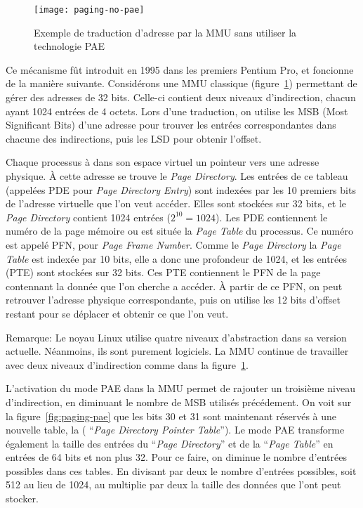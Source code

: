      \begin{figure}[h]
        \centering \texttt{[image: paging-no-pae]}
        \caption{Exemple de traduction d'adresse par la MMU sans utiliser la
          technologie PAE}
        \label{fig:paging-no-pae}
        \end{figure}
      
      Ce mécanisme fût introduit en 1995 dans les premiers Pentium Pro, et
      foncionne de la manière suivante. Considérons une MMU classique
      (figure~\ref{fig:paging-no-pae}) permettant de gérer des adresses de 32
      bits. Celle-ci contient deux niveaux d'indirection, chacun ayant 1024
      entrées de 4 octets. Lors d'une traduction, on utilise les MSB (Most
      Significant Bits) d'une adresse pour trouver les entrées correspondantes
      dans chacune des indirections, puis les LSD pour obtenir l'offset.

      Chaque processus à dans son espace virtuel un pointeur vers une adresse
      physique. À cette adresse se trouve le \textit{Page Directory}. Les
      entrées de ce tableau (appelées PDE pour \textit{Page Directory Entry})
      sont indexées par les 10 premiers bits de l'adresse virtuelle que l'on
      veut accéder. Elles sont stockées sur 32 bits, et le \textit{Page
        Directory} contient 1024 entrées ($2^{10} = 1024$). Les PDE contiennent
      le numéro de la page mémoire ou est située la \textit{Page Table} du
      processus. Ce numéro est appelé PFN, pour \textit{Page Frame
        Number}. Comme le \textit{Page Directory} la \textit{Page Table} est
      indexée par 10 bits, elle a donc une profondeur de 1024, et les entrées
      (PTE) sont stockées sur 32 bits. Ces PTE contiennent le PFN de la page
      contennant la donnée que l'on cherche a accéder. À partir de ce PFN, on
      peut retrouver l'adresse physique correspondante, puis on utilise les 12
      bits d'offset restant pour se déplacer et obtenir ce que l'on veut.

      \begin{paragraph}{Remarque:}
        Le noyau Linux utilise quatre niveaux d'abstraction dans sa version
        actuelle. Néanmoins, ils sont purement logiciels. La MMU continue de
        travailler avec deux niveaux d'indirection comme dans la
        figure~\ref{fig:paging-no-pae}.\newline
      \end{paragraph}
      
      L'activation du mode PAE dans la MMU permet de rajouter un troisième
      niveau d'indirection, en diminuant le nombre de MSB utilisés
      précédement. On voit sur la figure~\ref{fig:paging-pae} que les bits 30 et
      31 sont maintenant réservés à une nouvelle table, la ( ``\textit{Page
        Directory Pointer Table}''). Le mode PAE transforme également la taille
      des entrées du ``\textit{Page Directory}'' et de la ``\textit{Page
        Table}'' en entrées de 64 bits et non plus 32. Pour ce faire, on diminue
      le nombre d'entrées possibles dans ces tables. En divisant par deux le
      nombre d'entrées possibles, soit 512 au lieu de 1024, au multiplie par
      deux la taille des données que l'ont peut stocker.

